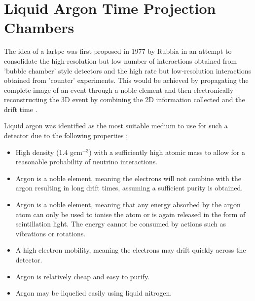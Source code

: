 \section{Liquid Argon Time Projection Chambers}\label{sec:lartpc}

The idea of a \gls{lartpc} was first proposed in 1977 by Rubbia in an attempt to consolidate the high-resolution but low number of interactions obtained from 'bubble chamber' style detectors and the high rate but low-resolution interactions obtained from 'counter' experiments. This would be achieved by propagating the complete image of an event through a noble element and then electronically reconstructing the 3D event by combining the 2D information collected and the drift time \cite{LArTPC_proposal}.

Liquid argon was identified as the most suitable medium to use for such a detector due to the following properties \cite{LArTPC_proposal}; 
\begin{itemize}
    \item High density (1.4 gcm$^{-3}$) with a sufficiently high atomic mass to allow for a reasonable probability of neutrino interactions.
    \item Argon is a noble element, meaning the electrons will not combine with the argon resulting in long drift times, assuming a sufficient purity is obtained.
    \item Argon is a noble element, meaning that any energy absorbed by the argon atom can only be used to ionise the atom or is again released in the form of scintillation light. The energy cannot be consumed by actions such as vibrations or rotations. 
    \item A high electron mobility, meaning the electrons may drift quickly across the detector.
    \item Argon is relatively cheap and easy to purify.
    \item Argon may be liquefied easily using liquid nitrogen. 
\end{itemize}

